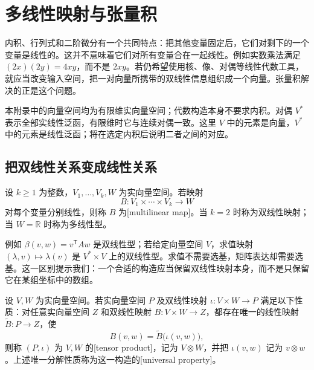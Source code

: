 \section{多线性映射与张量积}
\label{b1:sec:B101}

内积、行列式和二阶微分有一个共同特点：把其他变量固定后，它们对剩下的一个变量是线性的。这并不意味着它们对所有变量合在一起线性。例如实数乘法满足 \((2x)(2y)=4xy\)，而不是 \(2xy\)。若仍希望使用核、像、对偶等线性代数工具，就应当改变输入空间，把一对向量所携带的双线性信息组织成一个向量。张量积解决的正是这个问题。

\ProseParagraphBreak

本附录中的向量空间均为有限维实向量空间；代数构造本身不要求内积。对偶 \(V^*\) 表示全部实线性泛函，有限维时它与连续对偶一致。这里 \(V\) 中的元素是向量，\(V^*\) 中的元素是线性泛函；将在选定内积后说明二者之间的对应。

\subsection{把双线性关系变成线性关系}
\label{b1:subsec:B10101}

\begin{definition}\label{b1:def:app-b-multilinear}
设 \(k\ge1\) 为整数，\(V_1,\ldots,V_k,W\) 为实向量空间。若映射
\[
 B:V_1\times\cdots\times V_k\longrightarrow W
\]
对每个变量分别线性，则称 \(B\) 为[multilinear map]。当 \(k=2\) 时称为双线性映射；当 \(W=\mathbb R\) 时称为多线性型。
\end{definition}

例如 \(\beta(v,w)=v^{\mathsf T}Aw\) 是双线性型；若给定向量空间 \(V\)，求值映射 \((\lambda,v)\mapsto\lambda(v)\) 是 \(V^*\times V\) 上的双线性型。求值不需要选基，矩阵表达却需要选基。这一区别提示我们：一个合适的构造应当保留双线性映射本身，而不是只保留它在某组坐标中的数组。

\begin{definition}\label{b1:def:app-b-tensor-product}
设 \(V,W\) 为实向量空间。若实向量空间 \(P\) 及双线性映射 \(\iota:V\times W\rightarrow P\) 满足以下性质：对任意实向量空间 \(Z\) 和双线性映射 \(B:V\times W\rightarrow Z\)，都存在唯一的线性映射 \(\widetilde B:P\rightarrow Z\)，使
\[
 B(v,w)=\widetilde B\bigl(\iota(v,w)\bigr),
\]
则称 \((P,\iota)\) 为 \(V,W\) 的[tensor product]，记为 \(V\otimes W\)，并把 \(\iota(v,w)\) 记为 \(v\otimes w\)。上述唯一分解性质称为这一构造的[universal property]。
\end{definition}

